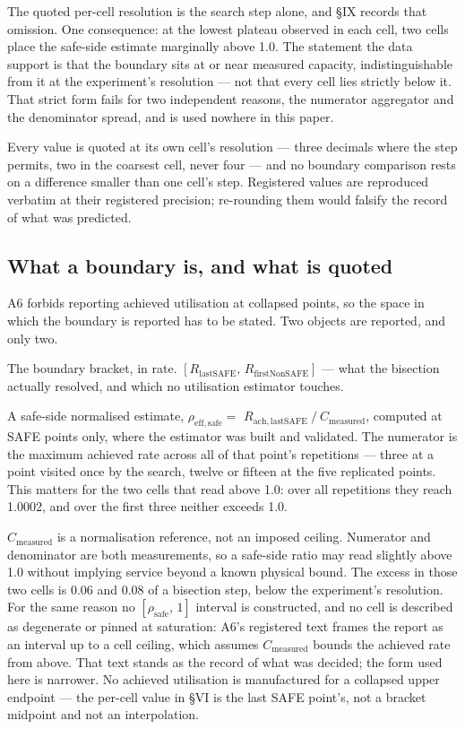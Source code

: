 \documentclass{ieeeaccess}
\begin{document}
The quoted per-cell resolution is the search step alone, and \S{}IX records that omission. One consequence: at the lowest plateau observed in each cell, two cells place the safe-side estimate marginally above 1.0. The statement the data support is that the boundary sits at or near measured capacity, indistinguishable from it at the experiment's resolution --- not that every cell lies strictly below it. That strict form fails for two independent reasons, the numerator aggregator and the denominator spread, and is used nowhere in this paper.

Every value is quoted at its own cell's resolution --- three decimals where the step permits, two in the coarsest cell, never four --- and no boundary comparison rests on a difference smaller than one cell's step. Registered values are reproduced verbatim at their registered precision; re-rounding them would falsify the record of what was predicted.

\subsection{What a boundary is, and what is quoted}

A6 forbids reporting achieved utilisation at collapsed points, so the space in which the boundary is reported has to be stated. Two objects are reported, and only two.

The boundary bracket, in rate. $[R_{\mathrm{lastSAFE}},\, R_{\mathrm{firstNonSAFE}}]$ --- what the bisection actually resolved, and which no utilisation estimator touches.

A safe-side normalised estimate, $\rho_{\mathrm{eff,safe}} =$ $R_{\mathrm{ach,lastSAFE}} \mathbin{/} C_{\mathrm{measured}}$, computed at SAFE points only, where the estimator was built and validated. The numerator is the maximum achieved rate across all of that point's repetitions --- three at a point visited once by the search, twelve or fifteen at the five replicated points. This matters for the two cells that read above 1.0: over all repetitions they reach 1.0002, and over the first three neither exceeds 1.0.

$C_{\mathrm{measured}}$ is a normalisation reference, not an imposed ceiling. Numerator and denominator are both measurements, so a safe-side ratio may read slightly above 1.0 without implying service beyond a known physical bound. The excess in those two cells is 0.06 and 0.08 of a bisection step, below the experiment's resolution. For the same reason no $[\rho_{\mathrm{safe}},\, 1]$ interval is constructed, and no cell is described as degenerate or pinned at saturation: A6's registered text frames the report as an interval up to a cell ceiling, which assumes $C_{\mathrm{measured}}$ bounds the achieved rate from above. That text stands as the record of what was decided; the form used here is narrower. No achieved utilisation is manufactured for a collapsed upper endpoint --- the per-cell value in \S{}VI is the last SAFE point's, not a bracket midpoint and not an interpolation.
\end{document}
